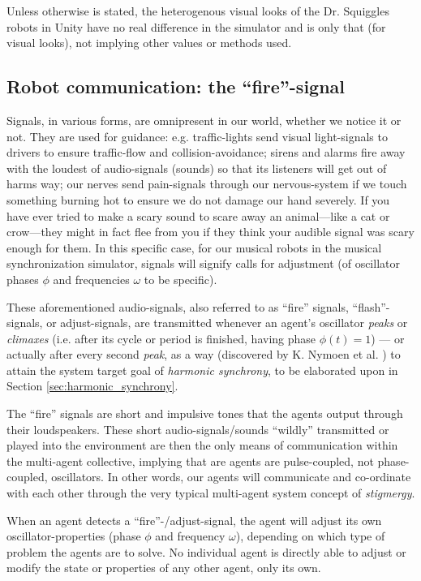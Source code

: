 	Unless otherwise is stated, the heterogenous visual looks of the Dr. Squiggles robots in Unity have no real difference in the simulator and is only that (for visual looks), not implying other values or methods used.

	
	\subsection{Robot communication: the ``fire''-signal}
	\label{subsec:fire_signal}
	
	Signals, in various forms, are omnipresent in our world, whether we notice it or not. They are used for guidance: e.g. traffic-lights send visual light-signals to drivers to ensure traffic-flow and collision-avoidance; sirens and alarms fire away with the loudest of audio-signals (sounds) so that its listeners will get out of harms way; our nerves send pain-signals through our nervous-system if we touch something burning hot to ensure we do not damage our hand severely. If you have ever tried to make a scary sound to scare away an animal—like a cat or crow—they might in fact flee from you if they think your audible signal was scary enough for them. In this specific case, for our musical robots in the musical synchronization simulator, signals will signify calls for adjustment (of oscillator phases $\phi$ and frequencies $\omega$ to be specific).

	These aforementioned audio-signals, also referred to as ``fire'' signals, ``flash''-signals, or adjust-signals, are transmitted whenever an agent's oscillator \textit{peaks} or \textit{climaxes} (i.e. after its cycle or period is finished, having phase $\phi(t)=1$) — or actually after every second \textit{peak}, as a way (discovered by K. Nymoen et al. \cite{nymoen_synch}) to attain the system target goal of \textit{harmonic synchrony}, to be elaborated upon in Section \ref{sec:harmonic_synchrony}.

	The ``fire'' signals are short and impulsive tones that the agents output through their loudspeakers. These short audio-signals/sounds ``wildly'' transmitted or played into the environment are then the only means of communication within the multi-agent collective, implying that are agents are pulse-coupled, not phase-coupled, oscillators. In other words, our agents will communicate and co-ordinate with each other through the very typical multi-agent system concept of \textit{stigmergy}.

	When an agent detects a ``fire''-/adjust-signal, the agent will adjust its own oscillator-properties (phase $\phi$ and frequency $\omega$), depending on which type of problem the agents are to solve. No individual agent is directly able to adjust or modify the state or properties of any other agent, only its own.
	
